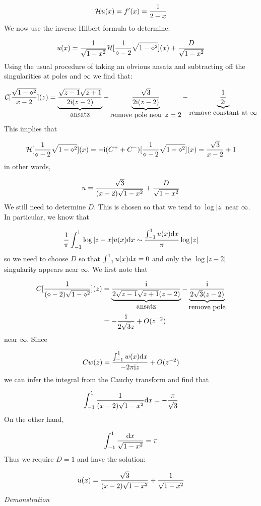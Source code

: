 \documentclass[12pt,landscape]{article}
\def\D{ {\rm d} }
\def\I{ {\rm i} }
\def\CC{ {\cal C} }
\def\HH{ {\cal H} }
\def\dx{\D x}
\begin{document}
{\[
\HH u(x) = f'(x) = {1 \over 2-x}
\]
We now use the inverse Hilbert formula to determine:

\[
u(x) = {1\over\sqrt{1-x^2}} \HH [{1 \over \diamond-2} \sqrt{1-\diamond^2}](x) + {D \over \sqrt{1-x^2}}
\]
Using the usual procedure of taking an obvious ansatz and subtracting off the singularities at poles and $\infty$ we find that:

\[
\CC[{\sqrt{1-\diamond^2} \over x -2}](z) =
\underbrace{\sqrt{z-1} \sqrt{z+1} \over 2 \I (z-2)}_{\hbox{ansatz}} - \underbrace{\sqrt 3\over 2 \I (z-2)}_{\hbox{remove pole near $z=2$}} - \underbrace{{1 \over 2 \I}}_{\hbox{remove constant at $\infty$}}
\]
This implies that

\[
\HH[{1 \over\diamond-2} \sqrt{1-\diamond^2}](x) = -\I(C^+ + C^-)[{1 \over\diamond-2} \sqrt{1-\diamond^2}](x) = {\sqrt 3 \over x -2} + 1
\]
in other words,

\[
u = {\sqrt{3} \over (x - 2) \sqrt{1-x^2}} + {D \over \sqrt{1-x^2}}
\]
We still need to determine $D$. This is chosen so that we tend to $\log |z|$ near $\infty$. In particular, we know that

\[
{1 \over \pi} \int_{-1}^1 \log|z-x| u(x) \dx \sim  {\int_{-1}^1 u(x) \dx \over \pi}  \log |z|
\]
so we need to choose $D$ so that $\int_{-1}^1 u(x) \dx = 0$ and only the $\log|z-2|$ singularity appears near $\infty$. We first note that


\begin{align*}
C[{1 \over (\diamond - 2) \sqrt{1-\diamond^2}}](z) &= \underbrace{{\I \over 2 \sqrt{z-1} \sqrt{z+1} (z-2)}}_{\hbox{ansatz}} - \underbrace{{\I \over  2\sqrt{3} (z-2)}}_{\hbox{remove pole}} \\
& = -{\I \over 2 \sqrt{3} z} + O(z^{-2})
\end{align*}
near $\infty$. Since

\[
Cw(z)  ={ \int_{-1}^1 w(x) \dx \over -2\pi \I z} + O(z^{-2})
\]
we can  infer the integral from the Cauchy transform and find that

\[
\int_{-1}^1 {1 \over (x - 2) \sqrt{1-x^2}} \dx = -{ \pi \over \sqrt{3}}
\]
On the other hand,

\[
\int_{-1}^1 {\dx \over \sqrt{1-x^2}} = \pi
\]
Thus we require $D = 1$ and have the solution:

\[
u(x) = {\sqrt{3} \over (x - 2) \sqrt{1-x^2}} + {1 \over \sqrt{1-x^2}}
\]
\emph{Demonstration}


}
\end{document}
